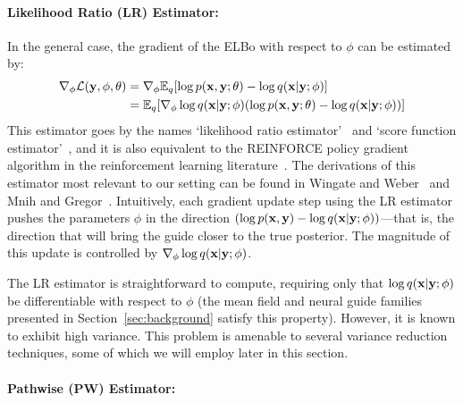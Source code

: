\paragraph{Likelihood Ratio (LR) Estimator:}
In the general case, the gradient of the ELBo with respect to $\phi$ can be estimated by:
\begin{align}
\begin{split}
\nabla_\phi \mathcal{L}(\mathbf{y}, \phi, \theta)
&= \nabla_\phi \mathbb{E}_{q}[ \log p(\mathbf{x}, \mathbf{y}; \theta) - \log q(\mathbf{x} | \mathbf{y} ; \phi) ]\\
&= \mathbb{E}_{q}[ \nabla_\phi \log q(\mathbf{x} | \mathbf{y} ; \phi) ( \log p(\mathbf{x}, \mathbf{y}; \theta) - \log q(\mathbf{x} | \mathbf{y} ; \phi) ) ]
\end{split}
\label{eq:lr}
\end{align}
This estimator goes by the names `likelihood ratio estimator'~\cite{LikelihoodRatioEstimator} and `score function estimator'~\cite{ScoreFunctionEstimator}, and it is also equivalent to the REINFORCE policy gradient algorithm in the reinforcement learning literature~\cite{REINFORCE}. The derivations of this estimator most relevant to our setting can be found in Wingate and Weber~\cite{AVIPP} and Mnih and Gregor~\cite{NVIL}.
Intuitively, each gradient update step using the LR estimator pushes the parameters $\phi$ in the direction $( \log p(\mathbf{x}, \mathbf{y}) - \log q(\mathbf{x} | \mathbf{y} ; \phi) )$---that is, the direction that will bring the guide closer to the true posterior. The magnitude of this update is controlled by $\nabla_\phi \log q(\mathbf{x} | \mathbf{y} ; \phi)$.

The LR estimator is straightforward to compute, requiring only that $\log q(\mathbf{x} | \mathbf{y} ; \phi)$ be differentiable with respect to $\phi$ (the mean field and neural guide families presented in Section~\ref{sec:background} satisfy this property). However, it is known to exhibit high variance. This problem is amenable to several variance reduction techniques, some of which we will employ later in this section.

\paragraph{Pathwise (PW) Estimator:}

